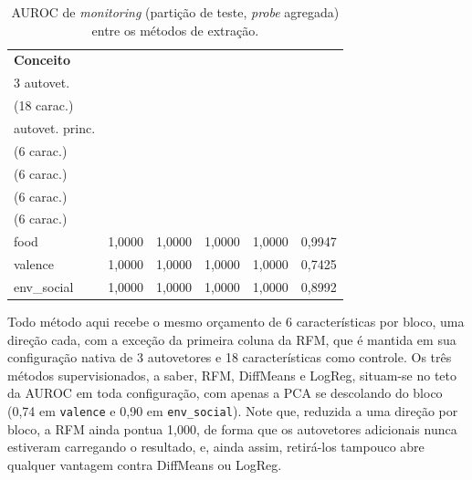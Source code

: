 \begin{table}[htbp]
  \centering
  \caption{AUROC de \textit{monitoring} (partição de teste, \textit{probe} agregada) entre os métodos de extração.}
  \label{tab:baselines_auroc}
  \small
  \begin{tabular}{@{}lccccc@{}}
    \toprule
    \textbf{Conceito} & \shortstack{\textbf{RFM}\\3 autovet.\\(18 carac.)} & \shortstack{\textbf{RFM}\\autovet. princ.\\(6 carac.)} & \shortstack{\textbf{DiffMeans}\\(6 carac.)} & \shortstack{\textbf{LogReg}\\(6 carac.)} & \shortstack{\textbf{PCA}\\(6 carac.)} \\
    \midrule
    food        & 1{,}0000 & 1{,}0000 & 1{,}0000 & 1{,}0000 & 0{,}9947 \\
    valence     & 1{,}0000 & 1{,}0000 & 1{,}0000 & 1{,}0000 & 0{,}7425 \\
    env\_social & 1{,}0000 & 1{,}0000 & 1{,}0000 & 1{,}0000 & 0{,}8992 \\
    \bottomrule
  \end{tabular}
\end{table}

Todo método aqui recebe o mesmo orçamento de 6 características por bloco, uma direção cada,
com a exceção da primeira coluna da RFM, que é mantida em sua configuração nativa de 3
autovetores e 18 características como controle. Os três métodos supervisionados, a saber,
RFM, DiffMeans e LogReg, situam-se no teto da AUROC em toda configuração, com apenas a PCA
se descolando do bloco (0{,}74 em \verb|valence| e 0{,}90 em \verb|env_social|). Note que,
reduzida a uma direção por bloco, a RFM ainda pontua 1{,}000, de forma que os autovetores
adicionais nunca estiveram carregando o resultado, e, ainda assim, retirá-los tampouco
abre qualquer vantagem contra DiffMeans ou LogReg.

